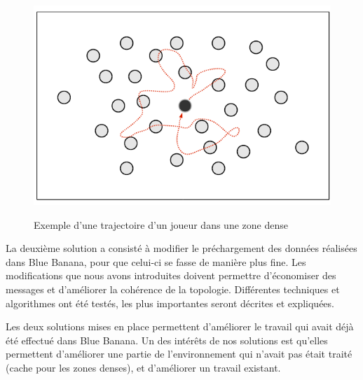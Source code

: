         \begin{figure}[!h]
        \centering
        \includegraphics[scale=0.25]{./Ressources/Images/mouvementsZoneDense.png}\\
        \caption{Exemple d'une trajectoire d'un joueur dans une zone dense}
        \label{mouveDense}
        \end{figure}
\par La deuxième solution a consisté à modifier le préchargement des données réalisées dans Blue Banana, pour que celui-ci se fasse de manière plus fine. Les modifications que nous avons introduites doivent permettre d'économiser des messages et d'améliorer la cohérence de la topologie. Différentes techniques et algorithmes ont été testés, les plus importantes seront décrites et expliquées.
\par Les deux solutions mises en place permettent d'améliorer le travail qui avait déjà été effectué dans Blue Banana. Un des intérêts de nos solutions est qu'elles permettent d'améliorer une partie de l'environnement qui n'avait pas était traité (cache pour les zones denses), et d'améliorer un travail existant.


